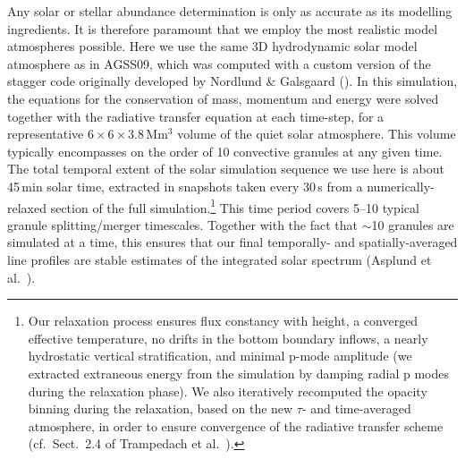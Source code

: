 \documentclass[traditabstract]{aa}
\begin{document}
Any solar or stellar abundance determination is only as accurate as its modelling ingredients. It is therefore paramount that we employ the most realistic model atmospheres possible. Here we use the same 3D hydrodynamic solar model atmosphere as in AGSS09, which was computed with a custom version of the {\sc stagger} code originally developed by Nordlund \& Galsgaard (\cite{stagger}). In this simulation, the equations for the conservation of mass, momentum and energy were solved together with the radiative transfer equation at each time-step, for a representative $6 \times 6 \times 3.8$\,Mm$^3$ volume of the quiet solar atmosphere.  This volume typically encompasses on the order of 10 convective granules at any given time.  The total temporal extent of the solar simulation sequence we use here is about 45\,min solar time, extracted in snapshots taken every 30\,s from a numerically-relaxed section of the full simulation.\footnote{Our relaxation process ensures flux constancy with height, a converged effective temperature, no drifts in the bottom boundary inflows, a nearly hydrostatic vertical stratification, and minimal p-mode amplitude (we extracted extraneous energy from the simulation by damping radial p modes during the relaxation phase). We also iteratively recomputed the opacity binning during the relaxation, based on the new $\tau$- and time-averaged atmosphere, in order to ensure convergence of the radiative transfer scheme (cf.\ Sect.~2.4 of Trampedach et al.\ \cite{trampedach:3Datmgrid}).}  This time period covers 5--10 typical granule splitting/merger timescales.  Together with the fact that $\sim$10 granules are simulated at a time, this ensures that our final temporally- and spatially-averaged line profiles are stable estimates of the integrated solar spectrum (Asplund et al.\ \cite{asp1}).
\end{document}
